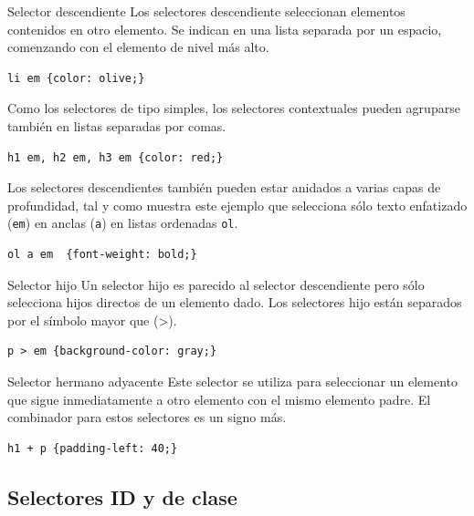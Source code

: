 \begin{frame}[fragile]{Selector descendiente} %
    Los selectores descendiente seleccionan elementos contenidos en otro
    elemento. Se indican en una lista separada por un espacio, comenzando con
    el elemento de nivel más alto.
    \begin{lstlisting}
li em {color: olive;}
    \end{lstlisting}
    Como los selectores de tipo simples, los selectores contextuales pueden
    agruparse también en listas separadas por comas. 
\begin{lstlisting}
h1 em, h2 em, h3 em {color: red;}
\end{lstlisting}

    Los selectores descendientes también pueden estar anidados a varias capas
    de profundidad,  tal y como muestra este ejemplo que selecciona  sólo texto
    enfatizado (\texttt{em}) en anclas (\texttt{a}) en listas ordenadas
    \texttt{ol}. 
\begin{lstlisting}
ol a em  {font-weight: bold;}
\end{lstlisting}
\end{frame}

\begin{frame}[fragile]{Selector hijo} %
    Un selector hijo es parecido al selector descendiente pero sólo selecciona
    hijos directos de un elemento dado. Los selectores hijo están separados por
    el símbolo mayor que (>). 
\begin{lstlisting}
p > em {background-color: gray;}
\end{lstlisting}
\end{frame}

\begin{frame}[fragile]{Selector hermano adyacente} %
    Este selector se utiliza para seleccionar un elemento que sigue
    inmediatamente a otro elemento con el mismo elemento padre. El combinador
    para estos selectores es un signo más. 

    \begin{lstlisting}
h1 + p {padding-left: 40;}
    \end{lstlisting}
\end{frame}

\subsection{Selectores ID y de clase} %

